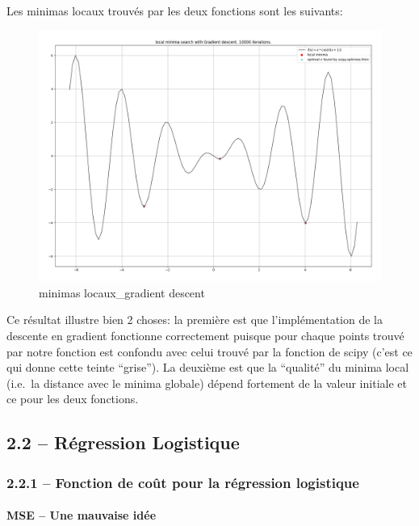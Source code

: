 \documentclass[
]{article}
\begin{document}
Les minimas locaux trouvés par les deux fonctions sont les suivants:

\begin{figure}
\centering
\includegraphics[width=1\textwidth,height=\textheight]{../res/3.1_gradient_descent_minima.png}
\caption{minimas locaux\_gradient descent}
\end{figure}

Ce résultat illustre bien 2 choses: la première est que l'implémentation
de la descente en gradient fonctionne correctement puisque pour chaque
points trouvé par notre fonction est confondu avec celui trouvé par la
fonction de scipy (c'est ce qui donne cette teinte ``grise''). La
deuxième est que la ``qualité'' du minima local (i.e.~la distance avec
le minima globale) dépend fortement de la valeur initiale et ce pour les
deux fonctions.

\newpage{}

\hypertarget{ruxe9gression-logistique-1}{%
\subsection{2.2 -- Régression
Logistique}\label{ruxe9gression-logistique-1}}

\hypertarget{fonction-de-couxfbt-pour-la-ruxe9gression-logistique}{%
\subsubsection{2.2.1 -- Fonction de coût pour la régression
logistique}\label{fonction-de-couxfbt-pour-la-ruxe9gression-logistique}}

\hypertarget{mse-une-mauvaise-iduxe9e}{%
\paragraph{MSE -- Une mauvaise idée}\label{mse-une-mauvaise-iduxe9e}}
\end{document}
